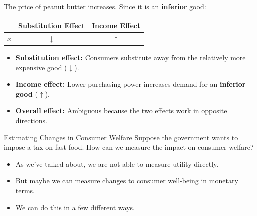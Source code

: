 \documentclass{beamer}
\begin{document}
\begin{frame}

  \bigskip
  The price of peanut butter increases. Since it is an \textbf{inferior} good:

  \bigskip
  \begin{center}
    \begin{tabular}{|c|c|c|}
      \hline
       & Substitution Effect & Income Effect \\
      \hline
      $x$ & $\downarrow$ & $\uparrow$ \\
      \hline
    \end{tabular}
  \end{center}

  \bigskip
  \begin{itemize}
    \item \textbf{Substitution effect:} Consumers substitute away from the relatively more expensive good ($\downarrow$).
    \item \textbf{Income effect:} Lower purchasing power increases demand for an \textbf{inferior good} ($\uparrow$).
    \item \textbf{Overall effect:} Ambiguous because the two effects work in opposite directions.
  \end{itemize}

\end{frame}

\begin{frame}{Estimating Changes in Consumer Welfare}
  Suppose the government wants to impose a tax on fast food. How can we measure the impact on consumer welfare?

  \begin{itemize}
    \item As we've talked about, we are not able to measure utility directly.

    \item But maybe we can measure changes to consumer well-being in monetary terms.

    \item We can do this in a few different ways.
  \end{itemize}
\end{frame}
\end{document}
